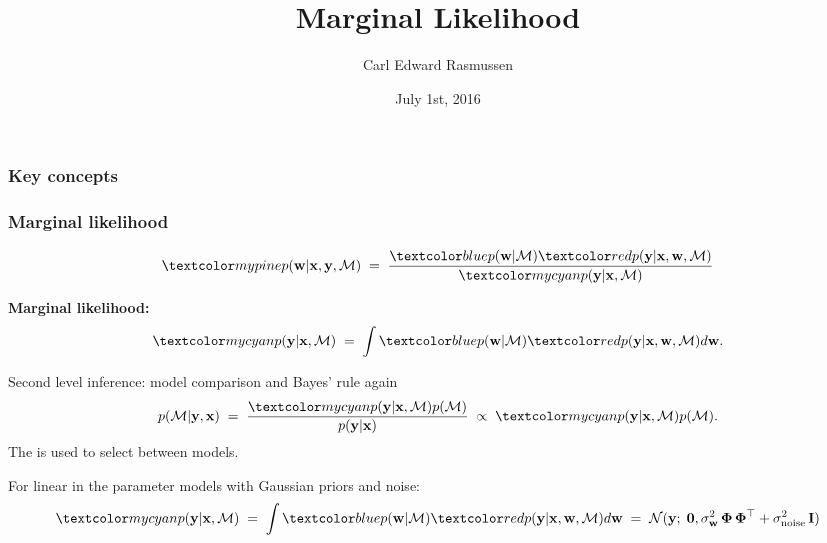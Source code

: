 

\title{Marginal Likelihood}
\author{Carl Edward Rasmussen}
\date{July 1st, 2016}



\begin{frame}
\titlepage
\end{frame}

\begin{frame}
\frametitle{Key concepts}

\end{frame}


\begin{frame}
\frametitle{Marginal likelihood}
\[
\Green{p({\bf w}|{\bf x},{\bf y},\mathcal{M})}\;=\;\frac{\Blue{p({\bf w}|\mathcal{M})}
\Red{p({\bf y}|{\bf x},{\bf w},\mathcal{M})}}{\Cyan{p({\bf y}|{\bf x},\mathcal{M})}}
\]

{\bf Marginal likelihood:}
\[
\Cyan{p({\bf y}|{\bf x},\mathcal{M})}\;=\;
\int\Blue{p({\bf w}|\mathcal{M})}\Red{p({\bf y}|{\bf x},{\bf w},\mathcal{M}})d{\bf w}.
\]

Second level inference: model comparison and Bayes' rule again
\[
p(\mathcal{M}|{\bf y},{\bf x})\;=\;\frac{\Cyan{p({\bf y}|{\bf
      x},\mathcal{M})} p(\mathcal{M})}{p({\bf y}|{\bf x})}
\;\propto\;\Cyan{p({\bf y}|{\bf x},\mathcal{M})}p(\mathcal{M}).
\]
The  is used to select between models.

For linear in the parameter models with Gaussian priors and noise:
\[
\Cyan{p({\bf y}|{\bf x},\mathcal{M})} \;=\;
\int\Blue{p({\bf w}|\mathcal{M})}\Red{p({\bf y}|{\bf x},{\bf w},\mathcal{M}})d{\bf w}
\;=\; \N(\bfy;\;\mathbf{0},\sigma_\bfw^2\,\bPhi\,\bPhi^\top+\sigma_\mathrm{noise}^2\,\bfI)
\]

\end{frame}


